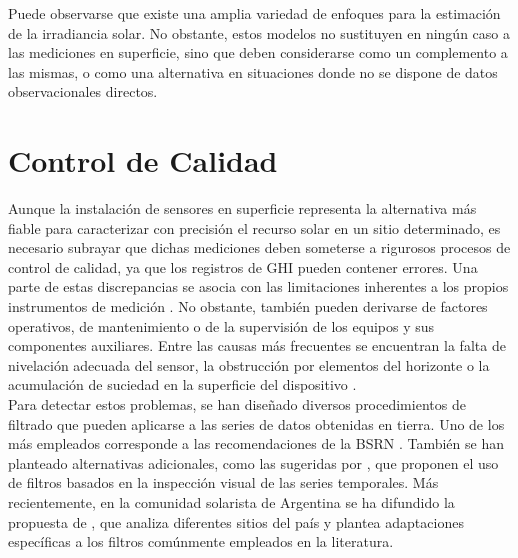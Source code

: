 Puede observarse que existe una amplia variedad de enfoques para la estimación de la irradiancia solar. No obstante, estos modelos no sustituyen en ningún caso a las mediciones en superficie, sino que deben considerarse como un complemento a las mismas, o como una alternativa en situaciones donde no se dispone de datos observacionales directos.

\section{Control de Calidad}
Aunque la instalación de sensores en superficie representa la alternativa más fiable para caracterizar con precisión el recurso solar en un sitio determinado, es necesario subrayar que dichas mediciones deben someterse a rigurosos procesos de control de calidad, ya que los registros de GHI pueden contener errores. Una parte de estas discrepancias se asocia con las limitaciones inherentes a los propios instrumentos de medición \citep{Vignola2019,Gueymard2009,Sengupta2024}. No obstante, también pueden derivarse de factores operativos, de mantenimiento o de la supervisión de los equipos y sus componentes auxiliares. Entre las causas más frecuentes se encuentran la falta de nivelación adecuada del sensor, la obstrucción por elementos del horizonte o la acumulación de suciedad en la superficie del dispositivo \citep{Moreno2016, Shi2008}.\\

Para detectar estos problemas, se han diseñado diversos procedimientos de filtrado que pueden aplicarse a las series de datos obtenidas en tierra. Uno de los más empleados corresponde a las recomendaciones de la BSRN \citep{Long2008, Long2010, Roesch2010}. También se han planteado alternativas adicionales, como las sugeridas por \cite{Mercosur}, que proponen el uso de filtros basados en la inspección visual de las series temporales. Más recientemente, en la comunidad solarista de Argentina se ha difundido la propuesta de \cite{Nollas2023}, que analiza diferentes sitios del país y plantea adaptaciones específicas a los filtros comúnmente empleados en la literatura.\\



